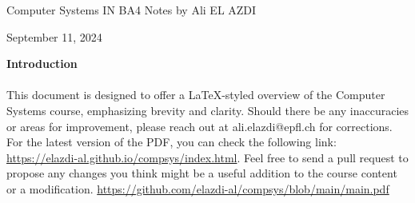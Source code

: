 
\begin{titlepage}
    \centering
    \vspace*{1cm}
    \Huge
    Computer Systems \newline
    \vspace{10px}
    \LARGE IN BA4
    \vspace*{10px}
    \newline
    \Large Notes by Ali EL AZDI

    \vfill
    \large
    September 11, 2024
\end{titlepage}

\begin{center}
    \vspace*{1cm}
    \textbf{Introduction}
    \newline
    \paragraph[short]{}{This document is designed to offer a LaTeX-styled overview of the Computer Systems course, emphasizing brevity and clarity. Should there be any inaccuracies or areas for improvement, please reach out at ali.elazdi@epfl.ch for corrections. For the latest version of the PDF, you can check the following link: 
    \url{https://elazdi-al.github.io/compsys/index.html}. Feel free to send a pull request to propose any changes you think might be a useful addition to the course content or a modification.}
    \newline
   \url{
        https://github.com/elazdi-al/compsys/blob/main/main.pdf
    }
    \newline
\end{center}


\tableofcontents

